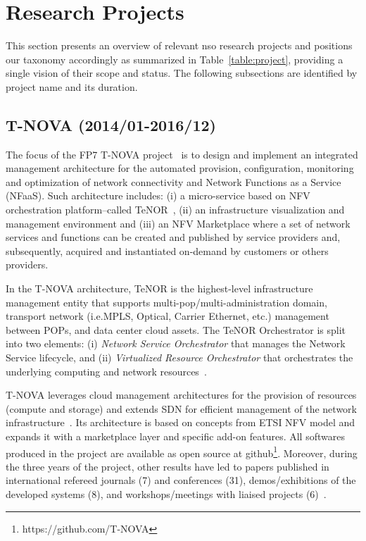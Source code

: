 \section{Research Projects}
\label{sec:project}

This section presents an overview of relevant \gls{nso} research projects and positions our taxonomy accordingly as summarized in Table~\ref{table:project}, providing a single vision of their scope and status. 
The following subsections are identified by project name and its duration.

\subsection{T-NOVA (2014/01-2016/12)}

The focus of the FP7 T-NOVA project~\cite{FP7projectT-NOVAT-NOVAInfrastructures} is to design and implement an integrated management architecture for the automated provision, configuration, monitoring and optimization of network connectivity and Network Functions as a Service (NFaaS). Such architecture includes: (i) a micro-service based on NFV orchestration platform--called TeNOR~\cite{7502419}, (ii) an infrastructure visualization and management environment and (iii) an NFV Marketplace where a set of network services and functions can be created and published by service providers and, subsequently, acquired and instantiated on-demand by customers
 or others providers.

In the T-NOVA architecture, TeNOR is the highest-level infrastructure management entity that supports multi-pop/multi-administration domain, transport network (i.e.MPLS, Optical, Carrier    Ethernet, etc.) management between POPs, and data center cloud assets. The TeNOR Orchestrator is split into two elements: (i) \textit{Network Service Orchestrator} that manages the Network Service lifecycle, and (ii) \textit{Virtualized Resource Orchestrator} that orchestrates the underlying computing and network resources~\cite{Kourtis2017T-NOVA:Infrastructures}. 

T-NOVA leverages cloud management architectures for the provision of resources (compute and storage) and extends SDN for efficient management of the network infrastructure~\cite{T-NOVAD2.1:Requirements}. Its architecture is based on concepts from ETSI NFV model and expands it with a marketplace layer and specific add-on features. All softwares produced in the project are available as open source at github\footnote{https://github.com/T-NOVA}. Moreover, during the three years of  the  project, other results have led to papers   published in international refereed journals (7) and conferences (31), demos/exhibitions of the developed systems (8), and workshops/meetings with liaised projects (6)~\cite{T-NOVA-D833}.

